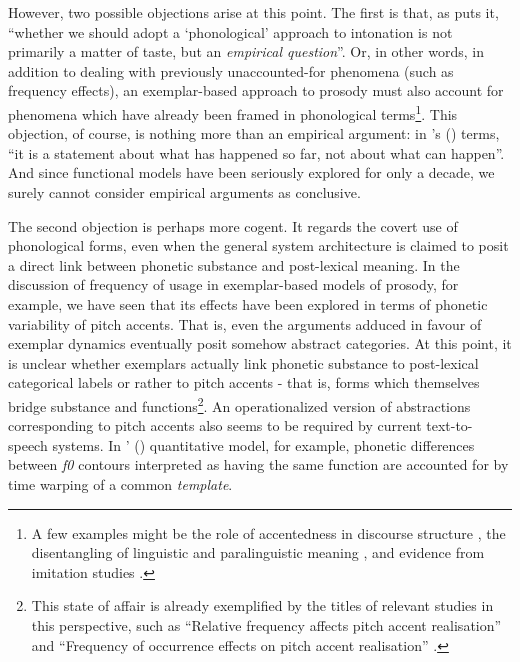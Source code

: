 However, two possible objections arise at this point. The first is that, as \citet[20]{ladd2008intonational} puts it, ``whether we should adopt a `phonological' approach to intonation is not primarily a matter of taste, but an \textit{empirical question}''. Or, in other words, in addition to dealing with previously unaccounted-for phenomena (such as frequency effects), an exemplar-based approach to prosody must also account for phenomena which have already been framed in phonological terms\footnote{A few examples might be the role of accentedness in discourse structure \citep{hawkins1991factors}, the disentangling of linguistic and paralinguistic meaning \citep{scherer1984vocal}, and evidence from imitation studies \citep{cole2011phonology}.}. This objection, of course, is nothing more than an empirical argument: in \citeauthor{smith1981categories}'s (\citeyear[33]{smith1981categories}) terms, ``it is a statement about what has happened so far, not about what can happen''. And since functional models have been seriously explored for only a decade, we surely cannot consider empirical arguments as conclusive.

The second objection is perhaps more cogent. It regards the covert use of phonological forms, even when the general system architecture is claimed to posit a direct link between phonetic substance and post-lexical meaning. In the discussion of frequency of usage in exemplar-based models of prosody, for example, we have seen that its effects have been explored in terms of phonetic variability of pitch accents. That is, even the arguments adduced in favour of exemplar dynamics eventually posit somehow abstract categories. At this point, it is unclear whether exemplars actually link phonetic substance to post-lexical categorical labels or rather to pitch accents - that is, forms which themselves bridge substance and functions\footnote{This state of affair is already exemplified by the titles of relevant studies in this perspective, such as ``Relative frequency affects pitch accent realisation'' \citep{schweitzer2010relative} and ``Frequency of occurrence effects on pitch accent realisation'' \citep{schweitzer2010frequency}.}. An operationalized version of abstractions corresponding to pitch accents also seems to be required by current text-to-speech systems. In \citeauthor{vansanten2000quantitative}' (\citeyear[278]{vansanten2000quantitative}) quantitative model, for example, phonetic differences between \textit{f0} contours interpreted as having the same function are accounted for by time warping of a common \textit{template}.

